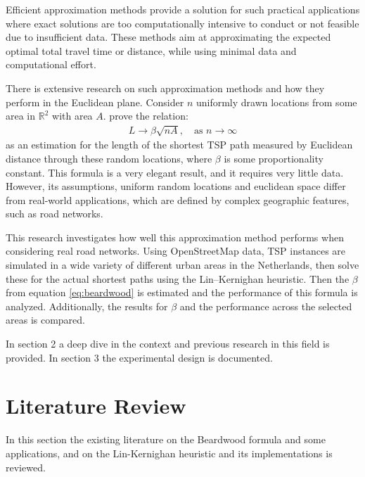 \documentclass[12pt]{article}
\numberwithin{equation}{section}
\newcommand{\1}[1]{\,I_{#1}} %
\begin{document}
Efficient approximation methods provide a solution for such practical applications where exact
solutions are too computationally intensive to conduct or not feasible due to insufficient data.
These methods aim at approximating the expected optimal total travel time or distance, while using
minimal data and computational effort.

There is extensive research on such approximation methods and how they perform in the Euclidean
plane.
Consider $n$ uniformly drawn locations from some area in $\mathbb{R}^2$ with area $A$.
\cite{beardwood1959shortest} prove the relation:
\begin{align}
	L \to \beta \sqrt{nA}, \quad \text{as } n \to \infty
	\label{eq:beardwood}
\end{align}
as an estimation for the length of the shortest TSP path measured by Euclidean distance through
these random locations, where $\beta$ is some proportionality constant. This formula is a very
elegant result, and it requires very little data. However, its assumptions,
uniform random locations and euclidean space differ from real-world applications, which are defined
by complex geographic features, such as road networks.

This research investigates how well this approximation method performs when considering real road
networks. Using OpenStreetMap data, TSP instances are simulated in a wide variety of different urban areas
in the Netherlands, then solve these for the actual shortest paths using the Lin–Kernighan \cite{lin1973effective} heuristic.
Then the $\beta$ from equation \ref{eq:beardwood} is estimated and the performance of this
formula is analyzed. Additionally, the results for $\beta$ and the performance across the selected
areas is compared.

In section 2 a deep dive in the context and previous research in this field is provided.
In section 3 the experimental design is documented.
\section{Literature Review}
In this section the existing literature on the Beardwood formula and some applications,
and on the Lin-Kernighan heuristic and its implementations is reviewed.
\end{document}
